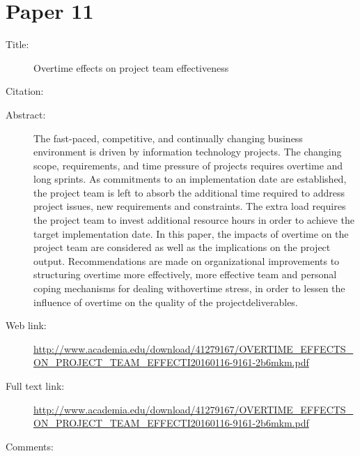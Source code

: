 \documentclass{scrartcl}
\begin{document}
\section*{Paper 11}
\begin{description}
\item[Title:]Overtime effects on project team effectiveness
\item[Citation:] \cite{olson2011overtime}
\item[Abstract:] The fast-paced, competitive, and continually changing business environment is driven by information technology projects. The changing scope, requirements, and time pressure of projects requires overtime and long sprints. As commitments to an implementation date are established, the project team is left to absorb the additional time required to address project issues, new requirements and constraints. The extra load requires the project team to invest additional resource hours in order to achieve the target implementation date. In this paper, the impacts of overtime on the project team are considered as well as the implications on the project output. Recommendations are made on organizational improvements to structuring overtime more effectively, more effective team and personal coping mechanisms for dealing withovertime stress, in order to lessen the influence of overtime on the quality of the projectdeliverables.
\item[Web link:]\url  {http://www.academia.edu/download/41279167/OVERTIME_EFFECTS_ON_PROJECT_TEAM_EFFECTI20160116-9161-2b6mkm.pdf}
\item[Full text link:]\url  {http://www.academia.edu/download/41279167/OVERTIME_EFFECTS_ON_PROJECT_TEAM_EFFECTI20160116-9161-2b6mkm.pdf}
\item[Comments:] 
\end{description}
\end{document}
